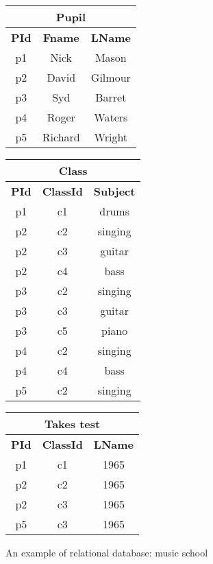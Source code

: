  \begin{figure}[htb]
        
        \begin{tabular}{|c c c|}
            \multicolumn{3}{c}{\textbf{Pupil}}\\
      \hline
            \textbf{PId} & \textbf{Fname} & \textbf{LName}\\ \hline
        p1 &  Nick  & Mason\\
        p2 &  David & Gilmour\\
        p3 &  Syd   & Barret\\
        p4 &  Roger & Waters\\
        p5 &  Richard & Wright \\\hline
    \end{tabular}
     \hfill
        \begin{tabular}{|c c c|}
            \multicolumn{3}{c}{\textbf{Class}}\\
      \hline
            \textbf{PId} & \textbf{ClassId} & \textbf{Subject}\\ \hline
       p1 & c1& drums \\
       p2 & c2& singing \\
       p2 & c3& guitar\\
       p2 & c4& bass \\
       p3 & c2& singing\\
       p3 & c3& guitar\\
       p3 & c5& piano\\
       p4 & c2& singing\\
       p4 & c4& bass\\
       p5 & c2& singing \\\hline
        \end{tabular}
        \hfill
        \begin{tabular}{|c c c|}
            \multicolumn{3}{c}{\textbf{Takes test}}\\
      \hline
            \textbf{PId} & \textbf{ClassId} & \textbf{LName}\\ \hline
        p1 & c1 & 1965\\
        p2 & c2 & 1965\\
        p2 & c3 & 1965\\
        p5 & c3 & 1965\\\hline
    \end{tabular}
    \caption{An example of relational database: music school}
    \label{fig:relational_database_school}
    \end{figure}


